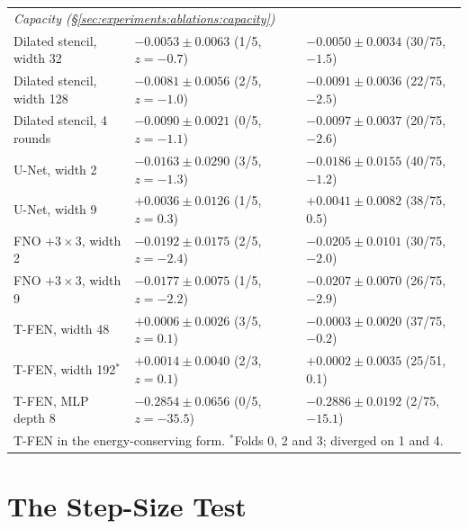 \begin{table}[!h]
\begin{tabular}{l l l}
    \midrule
    \multicolumn{3}{l}{\emph{Capacity (\S\ref{sec:experiments:ablations:capacity})}} \\
    Dilated stencil, width 32 & $-0.0053 \pm 0.0063$ (1/5, $z = -0.7$) & $-0.0050 \pm 0.0034$ (30/75, $-1.5$) \\
    Dilated stencil, width 128 & $-0.0081 \pm 0.0056$ (2/5, $z = -1.0$) & $-0.0091 \pm 0.0036$ (22/75, $-2.5$) \\
    Dilated stencil, 4 rounds & $-0.0090 \pm 0.0021$ (0/5, $z = -1.1$) & $-0.0097 \pm 0.0037$ (20/75, $-2.6$) \\
    U-Net, width 2 & $-0.0163 \pm 0.0290$ (3/5, $z = -1.3$) & $-0.0186 \pm 0.0155$ (40/75, $-1.2$) \\
    U-Net, width 9 & $+0.0036 \pm 0.0126$ (1/5, $z = 0.3$) & $+0.0041 \pm 0.0082$ (38/75, 0.5) \\
    FNO $+ 3{\times}3$, width 2 & $-0.0192 \pm 0.0175$ (2/5, $z = -2.4$) & $-0.0205 \pm 0.0101$ (30/75, $-2.0$) \\
    FNO $+ 3{\times}3$, width 9 & $-0.0177 \pm 0.0075$ (1/5, $z = -2.2$) & $-0.0207 \pm 0.0070$ (26/75, $-2.9$) \\
    T-FEN, width 48 & $+0.0006 \pm 0.0026$ (3/5, $z = 0.1$) & $-0.0003 \pm 0.0020$ (37/75, $-0.2$) \\
    T-FEN, width 192$^\ast$ & $+0.0014 \pm 0.0040$ (2/3, $z = 0.1$) & $+0.0002 \pm 0.0035$ (25/51, 0.1) \\
    T-FEN, MLP depth 8 & $-0.2854 \pm 0.0656$ (0/5, $z = -35.5$) & $-0.2886 \pm 0.0192$ (2/75, $-15.1$) \\
    \bottomrule
    \multicolumn{3}{l}{T-FEN in the energy-conserving form. $^\ast$Folds 0, 2 and 3; diverged on 1 and 4.}
  \end{tabular}
\end{table}


\clearpage
\section{The Step-Size Test}
\label{app:full-results:step-ladder}

